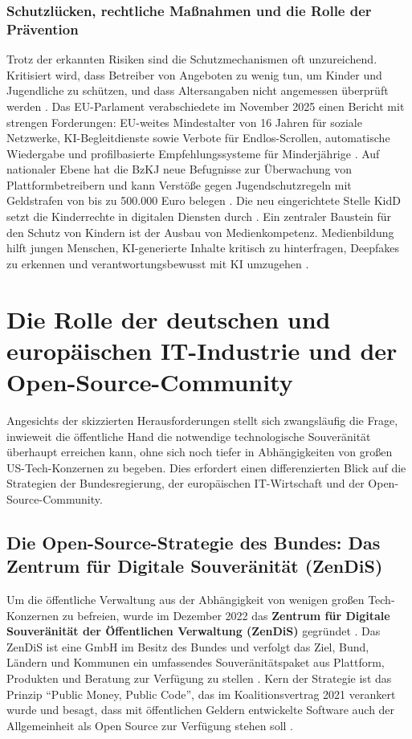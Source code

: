 \documentclass[12pt,a4paper]{article}
\begin{document}
	\subsubsection{Schutzlücken, rechtliche Maßnahmen und die Rolle der Prävention}
	
	Trotz der erkannten Risiken sind die Schutzmechanismen oft unzureichend. Kritisiert wird, dass Betreiber von Angeboten zu wenig tun, um Kinder und Jugendliche zu schützen, und dass Altersangaben nicht angemessen überprüft werden \cite{BzKJ2025b}. Das EU-Parlament verabschiedete im November 2025 einen Bericht mit strengen Forderungen: EU-weites Mindestalter von 16 Jahren für soziale Netzwerke, KI-Begleitdienste sowie Verbote für Endlos-Scrollen, automatische Wiedergabe und profilbasierte Empfehlungssysteme für Minderjährige \cite{EUParliament2025}. Auf nationaler Ebene hat die BzKJ neue Befugnisse zur Überwachung von Plattformbetreibern und kann Verstöße gegen Jugendschutzregeln mit Geldstrafen von bis zu 500.000 Euro belegen \cite{BzKJ2025a}. Die neu eingerichtete Stelle KidD setzt die Kinderrechte in digitalen Diensten durch \cite{KidD2025}. Ein zentraler Baustein für den Schutz von Kindern ist der Ausbau von Medienkompetenz. Medienbildung hilft jungen Menschen, KI-generierte Inhalte kritisch zu hinterfragen, Deepfakes zu erkennen und verantwortungsbewusst mit KI umzugehen \cite{LMK2025}.
	
	\section{Die Rolle der deutschen und europäischen IT-Industrie und der Open-Source-Community}
	
	Angesichts der skizzierten Herausforderungen stellt sich zwangsläufig die Frage, inwieweit die öffentliche Hand die notwendige technologische Souveränität überhaupt erreichen kann, ohne sich noch tiefer in Abhängigkeiten von großen US-Tech-Konzernen zu begeben. Dies erfordert einen differenzierten Blick auf die Strategien der Bundesregierung, der europäischen IT-Wirtschaft und der Open-Source-Community.
	
	\subsection{Die Open-Source-Strategie des Bundes: Das Zentrum für Digitale Souveränität (ZenDiS)}
	
	Um die öffentliche Verwaltung aus der Abhängigkeit von wenigen großen Tech-Konzernen zu befreien, wurde im Dezember 2022 das \textbf{Zentrum für Digitale Souveränität der Öffentlichen Verwaltung (ZenDiS)} gegründet \cite{ZenDiS2025}. Das ZenDiS ist eine GmbH im Besitz des Bundes und verfolgt das Ziel, Bund, Ländern und Kommunen ein umfassendes Souveränitätspaket aus Plattform, Produkten und Beratung zur Verfügung zu stellen \cite{ZenDiS2025}. Kern der Strategie ist das Prinzip \enquote{Public Money, Public Code}, das im Koalitionsvertrag 2021 verankert wurde und besagt, dass mit öffentlichen Geldern entwickelte Software auch der Allgemeinheit als Open Source zur Verfügung stehen soll \cite{SovereignTechFund2025}.
	
\end{document}
